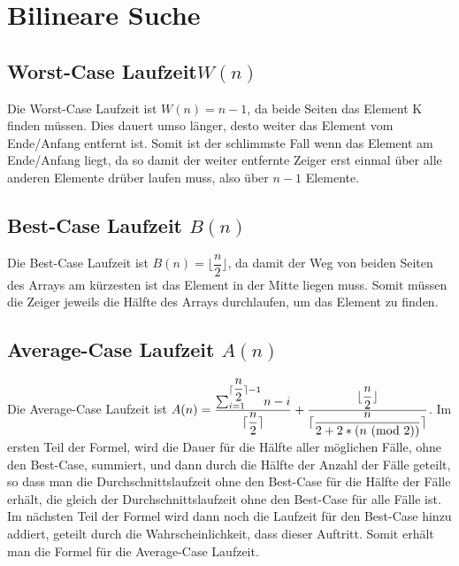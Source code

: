 \section{Bilineare Suche}
\subsection{Worst-Case Laufzeit$W(n)$}
Die Worst-Case Laufzeit ist $W(n)=n-1$, da beide Seiten das Element K finden müssen. Dies dauert umso länger, desto weiter das Element vom Ende/Anfang entfernt ist. Somit ist der schlimmste Fall wenn das Element am Ende/Anfang liegt, da so damit der weiter entfernte Zeiger erst einmal über alle anderen Elemente drüber laufen muss, also über $n - 1$ Elemente.
\subsection{Best-Case Laufzeit $B(n)$}
Die Best-Case Laufzeit ist $B(n)= \lfloor \dfrac{n}{2} \rfloor$, da damit der Weg von beiden Seiten des Arrays am kürzesten ist das Element in der Mitte liegen muss. Somit müssen die Zeiger jeweils die Hälfte des Arrays durchlaufen, um das Element zu finden.
\subsection{Average-Case Laufzeit $A(n)$}
Die Average-Case Laufzeit ist $A(n) = \dfrac{\sum\nolimits_{i=1}^{\lceil \dfrac{n}{2} \rceil -1} n - i}{\lceil \dfrac{n}{2} \rceil} +  \dfrac{\lfloor \dfrac{n}{2} \rfloor}{\lceil \dfrac{n}{2+2*(n \ (\mathrm{mod}\ 2))} \rceil}$. Im ersten Teil der Formel, wird die Dauer für die Hälfte aller möglichen Fälle, ohne den Best-Case, summiert, und dann durch die Hälfte der Anzahl der Fälle geteilt, so dass man die Durchschnittslaufzeit ohne den Best-Case für die Hälfte der Fälle erhält, die gleich der Durchschnittslaufzeit ohne den Best-Case für alle Fälle ist. Im nächsten Teil der Formel wird dann noch die Laufzeit für den Best-Case hinzu addiert, geteilt durch die Wahrscheinlichkeit, dass dieser Auftritt. Somit erhält man die Formel für die Average-Case Laufzeit.